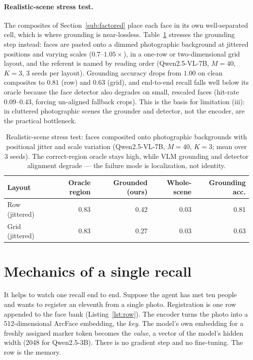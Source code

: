 \paragraph{Realistic-scene stress test.} The composites of Section~\ref{sub:factored} place each face in its own well-separated cell, which is where grounding is near-lossless. Table~\ref{tab:realistic} stresses the grounding step instead: faces are pasted onto a dimmed photographic background at jittered positions and varying scales ($0.7$--$1.05\times$), in a one-row or two-dimensional grid layout, and the referent is named by reading order (Qwen2.5-VL-7B, $M{=}40$, $K{=}3$, $3$ seeds per layout). Grounding accuracy drops from $1.00$ on clean composites to $0.81$ (row) and $0.63$ (grid), and end-to-end recall falls well below its oracle because the face detector also degrades on small, rescaled faces (hit-rate $0.09$--$0.43$, forcing un-aligned fallback crops). This is the basis for limitation (iii): in cluttered photographic scenes the grounder and detector, not the encoder, are the practical bottleneck.

\begin{table}[h]
\small\centering
\caption{Realistic-scene stress test: faces composited onto photographic backgrounds with positional jitter and scale variation (Qwen2.5-VL-7B, $M{=}40$, $K{=}3$; mean over $3$ seeds). The correct-region oracle stays high, while VLM grounding and detector alignment degrade --- the failure mode is localization, not identity.}
\label{tab:realistic}
\begin{tabular}{@{}lrrrr@{}}
\toprule
\textbf{Layout} & \textbf{Oracle region} & \textbf{Grounded (ours)} & \textbf{Whole-scene} & \textbf{Grounding acc.} \\
\midrule
Row (jittered)  & 0.83 & 0.42 & 0.03 & 0.81 \\
Grid (jittered) & 0.83 & 0.27 & 0.03 & 0.63 \\
\bottomrule
\end{tabular}
\end{table}

\section{Mechanics of a single recall}
\label{app:anatomy}

It helps to watch one recall end to end. Suppose the agent has met ten people and wants to register an eleventh from a single photo. Registration is one row appended to the face bank (Listing~\ref{lst:row}). The encoder turns the photo into a 512-dimensional ArcFace embedding, the \emph{key}. The model's own embedding for a freshly assigned marker token becomes the \emph{value}, a vector of the model's hidden width (2048 for Qwen2.5-3B). There is no gradient step and no fine-tuning. The row is the memory.

